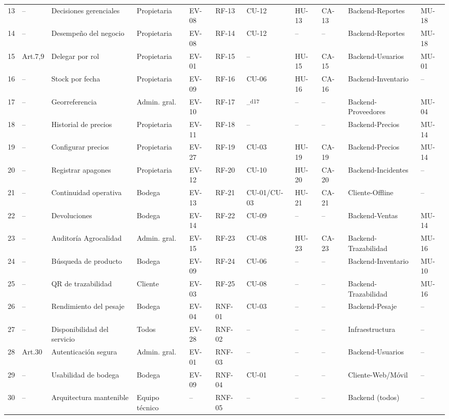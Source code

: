 \documentclass[11pt,a4paper]{article}
\begin{document}
\begin{longtable}{|p{0.5cm}|p{1.5cm}|p{2.2cm}|p{1.5cm}|p{0.8cm}|p{0.8cm}|p{0.8cm}|p{0.8cm}|p{0.8cm}|p{1.3cm}|p{1cm}|}
13 & -- & Decisiones gerenciales & Propietaria & EV-08 & RF-13 & CU-12 & HU-13 & CA-13 & Backend-Reportes & MU-18 \\
14 & -- & Desempeño del negocio & Propietaria & EV-08 & RF-14 & CU-12 & -- & -- & Backend-Reportes & MU-18 \\
15 & Art.7,9 & Delegar por rol & Propietaria & EV-01 & RF-15 & -- & HU-15 & CA-15 & Backend-Usuarios & MU-01 \\
16 & -- & Stock por fecha & Propietaria & EV-09 & RF-16 & CU-06 & HU-16 & CA-16 & Backend-Inventario & -- \\
17 & -- & Georreferencia & Admin. gral. & EV-10 & RF-17 & --\textsuperscript{d17} & -- & -- & Backend-Proveedores & MU-04 \\
18 & -- & Historial de precios & Propietaria & EV-11 & RF-18 & -- & -- & -- & Backend-Precios & MU-14 \\
19 & -- & Configurar precios & Propietaria & EV-27 & RF-19 & CU-03 & HU-19 & CA-19 & Backend-Precios & MU-14 \\
20 & -- & Registrar apagones & Propietaria & EV-12 & RF-20 & CU-10 & HU-20 & CA-20 & Backend-Incidentes & -- \\
21 & -- & Continuidad operativa & Bodega & EV-13 & RF-21 & CU-01/CU-03 & HU-21 & CA-21 & Cliente-Offline & -- \\
22 & -- & Devoluciones & Bodega & EV-14 & RF-22 & CU-09 & -- & -- & Backend-Ventas & MU-14 \\
23 & -- & Auditoría Agrocalidad & Admin. gral. & EV-15 & RF-23 & CU-08 & HU-23 & CA-23 & Backend-Trazabilidad & MU-16 \\
24 & -- & Búsqueda de producto & Bodega & EV-09 & RF-24 & CU-06 & -- & -- & Backend-Inventario & MU-10 \\
25 & -- & QR de trazabilidad & Cliente & EV-03 & RF-25 & CU-08 & -- & -- & Backend-Trazabilidad & MU-16 \\
26 & -- & Rendimiento del pesaje & Bodega & EV-04 & RNF-01 & CU-03 & -- & -- & Backend-Pesaje & -- \\
27 & -- & Disponibilidad del servicio & Todos & EV-28 & RNF-02 & -- & -- & -- & Infraestructura & -- \\
28 & Art.30 & Autenticación segura & Admin. gral. & EV-01 & RNF-03 & -- & -- & -- & Backend-Usuarios & -- \\
29 & -- & Usabilidad de bodega & Bodega & EV-09 & RNF-04 & CU-01 & -- & -- & Cliente-Web/Móvil & -- \\
30 & -- & Arquitectura mantenible & Equipo técnico & -- & RNF-05 & -- & -- & -- & Backend (todos) & -- \\

\end{longtable}
\end{document}
